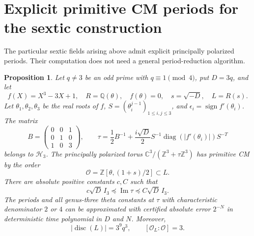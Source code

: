\documentclass[11pt]{article}
\newtheorem{proposition}[theorem]{Proposition}
\theoremstyle{definition}
\theoremstyle{remark}
\begin{document}
\section{Explicit primitive CM periods for the sextic construction}
\label{sec:sextic-cm-periods}

The particular sextic fields arising above admit explicit
principally polarized periods. Their computation does not need
a general period-reduction algorithm.

\begin{proposition}\label{prop:explicit-sextic-cm-periods}
Let \(q\ne3\) be an odd prime with \(q\equiv1\pmod4\), put
\(D=3q\), and let
\[
 f(X)=X^3-3X+1,\quad R=\mathbb Q(\theta),\quad f(\theta)=0,
 \quad s=\sqrt{-D},\quad L=R(s).
\]
Let \(\theta_1,\theta_2,\theta_3\) be the real roots of \(f\),
\(S=(\theta_i^{j-1})_{1\leq i,j\leq3}\), and
\(\epsilon_i=\operatorname{sign}f'(\theta_i)\).
The matrix
\[
 B=\begin{pmatrix}0&0&1\\0&1&0\\1&0&3\end{pmatrix},
 \qquad
 \tau=\frac12B^{-1}
 +\frac{i\sqrt D}{2}
 S^{-1}\operatorname{diag}(|f'(\theta_i)|)S^{-T}
\]
belongs to \(\mathcal H_3\). The principally polarized torus
\(\mathbb C^3/(\mathbb Z^3+\tau\mathbb Z^3)\)
has primitive CM by the order
\[
 \mathcal O=\mathbb Z[\theta,(1+s)/2]\subset L.
\]
There are absolute positive constants \(c,C\) such that
\[
 c\sqrt D\,I_3\preceq\operatorname{Im}\tau
                   \preceq C\sqrt D\,I_3.
\]
The periods and all genus-three theta constants at \(\tau\)
with characteristic denominator \(2\) or \(4\)
can be approximated with certified absolute error \(2^{-N}\)
in deterministic time polynomial in \(D\) and \(N\).
Moreover,
\[
 |\operatorname{disc}(L)|=3^9q^3,
 \qquad [\mathcal O_L:\mathcal O]=3.
\]
\end{proposition}
\end{document}
